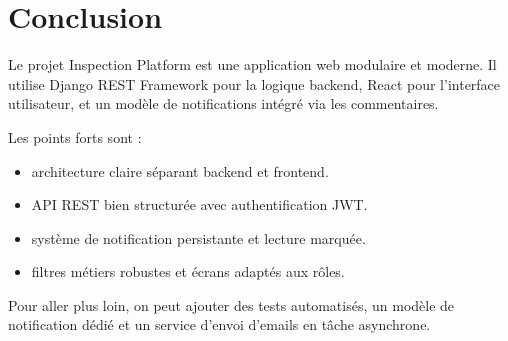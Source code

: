 \documentclass[12pt,a4paper]{article}
\begin{document}
\section{Conclusion}
Le projet Inspection Platform est une application web modulaire et moderne. Il utilise Django REST Framework pour la logique backend, React pour l’interface utilisateur, et un modèle de notifications intégré via les commentaires.

Les points forts sont :
\begin{itemize}
    \item architecture claire séparant backend et frontend.
    \item API REST bien structurée avec authentification JWT.
    \item système de notification persistante et lecture marquée.
    \item filtres métiers robustes et écrans adaptés aux rôles.
\end{itemize}

Pour aller plus loin, on peut ajouter des tests automatisés, un modèle de notification dédié et un service d’envoi d’emails en tâche asynchrone.
\end{document}
